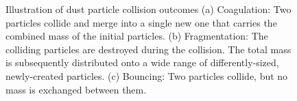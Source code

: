 \begin{figure}[h!]
    \centering
    \makebox[\textwidth]{
        \begin{minipage}{.33\paperwidth}
            \centering
          	\subfloat[Coagulation]{  %
                \label{:a}
                \illustrateCoagulation
          	}
        \end{minipage}%
        \begin{minipage}{.33\paperwidth}
            \centering
          	\subfloat[Fragmentation]{
                \label{:b}
                \illustrateFragmentation
          	}
        \end{minipage}
        \begin{minipage}{.33\paperwidth}
            \centering
          	\subfloat[Bouncing]{
                \label{:b}
                \illustrateBouncing
          	}
        \end{minipage}%
    }
    \caption{
        Illustration of dust particle collision outcomes
        (a) Coagulation: Two particles collide and merge into a single new one that
            carries the combined mass of the initial particles.
        (b) Fragmentation: The colliding particles are destroyed during the collision.
            The total mass is subsequently distributed onto a wide range of differently-sized,
            newly-created particles.
        (c) Bouncing: Two particles collide, but no mass is exchanged between them.
    }
    \label{fig:collision_outcomes}
\end{figure} 
